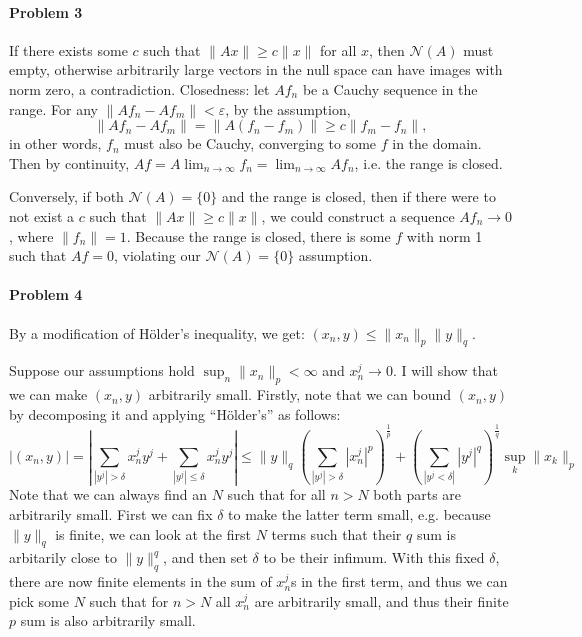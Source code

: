 \documentclass[12pt]{article}
\newcommand{\N}{\mathcal{N}}
\begin{document}
\paragraph{Problem 3}

If there exists some $c$ such that $\|Ax\|\geq c\|x\|$ for all $x$, then $\N(A)$
must empty, otherwise arbitrarily large vectors in the null space can have images
with norm zero, a contradiction. Closedness: let $Af_n$ be a Cauchy sequence in
the range. For any $\|Af_n-Af_m\| < \varepsilon$, by the assumption,
\begin{displaymath}
  \|Af_n-Af_m\| = \|A(f_n-f_m)\| \geq c\|f_m-f_n\|,
\end{displaymath}
in other words, $f_n$ must also be Cauchy, converging to some $f$ in the domain.
Then by continuity, $Af = A\lim_{n\to\infty}f_n = \lim_{n\to\infty}Af_n$, i.e. the
range is closed.

Conversely, if both $\N(A) = \{0\}$ and the range is closed, then if there were
to not exist a $c$ such that $\|Ax\|\geq c\|x\|$, we could construct a
sequence $Af_n\to 0$, where $\|f_n\| = 1$. Because the range is closed, there is
some $f$ with norm 1 such that $Af = 0$, violating our $\N(A) = \{0\}$
assumption.

\paragraph{Problem 4}
By a modification of H\"older's inequality, we get: $(x_n,y) \leq \|x_n\|_p
\|y\|_q$.

Suppose our assumptions hold $\sup_n\|x_n\|_p<\infty$ and $x_n^j\to 0$. I will
show that we can make $(x_n,y)$ arbitrarily small. Firstly, note that we can
bound $(x_n,y)$ by decomposing it and applying ``H\"older's'' as follows:
\begin{displaymath}
  |(x_n,y)| =
  |\sum_{|y^j|>\delta}x_n^jy^j + \sum_{|y^j|\leq \delta}x_n^jy^j|
  \leq \|y\|_q\left(\sum_{|y^j|>\delta}|x_n^j|^p\right)^{\frac{1}{p}} +
  \left(\sum_{|y^j<\delta|}|y^j|^q\right)^{\frac{1}{q}}\sup_k\|x_k\|_p
\end{displaymath}
Note that we can always find an $N$ such that for all $n > N$ both parts are
arbitrarily small. First we can fix $\delta$ to make the latter term small,
e.g. because $\|y\|_q$ is finite, we can look at the first $N$ terms such that
their $q$ sum is arbitarily close to $\|y\|^q_q$, and then set $\delta$ to be
their infimum. With this fixed $\delta$, there are now finite elements in
the sum of $x^j_n$s in the first term, and thus we can pick some $N$ such that
for $n>N$ all $x^j_n$ are arbitrarily small, and thus their finite $p$ sum is
also arbitrarily small.
\end{document}
